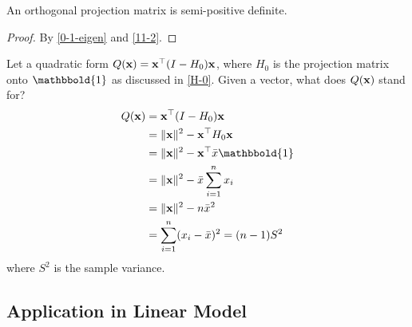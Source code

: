     \begin{Thm}
        An orthogonal projection matrix is semi-positive definite.
        \begin{proof}
            By \cref{0-1-eigen} and \cref{11-2}.
         \end{proof}
    \end{Thm}

    \begin{Ex}
        Let a quadratic form $Q(\mathbf{x}) = \mathbf{x}^{\top}(I - H_0)\mathbf{x}$, where $H_0$ is the projection matrix onto $\mathbbold{1}$ as discussed in \cref{H-0}. Given a vector, what does $Q(\mathbf{x})$ stand for?
        \begin{align*}
            Q(\B{x}) &= \T{\B{x}}(I - H_0)\B{x}\\
            & = \norm{\B{x}}^2 - \T{\B{x}}H_0 \B{x}\\
            & = \norm{\B{x}}^2 - \T{\B{x}}\bar{x}\mathbbold{1}\\
            & = \norm{\B{x}}^2 - \bar{x}\sum_{i = 1}^n x_i\\
            & = \norm{\B{x}}^2 - n\bar{x}^2\\
            & = \sum_{i = 1}^n (x_i - \bar{x})^2 = (n - 1) S^2
        \end{align*}
        where $S^2$ is the sample variance.
    \end{Ex}
\subsection{Application in Linear Model}

